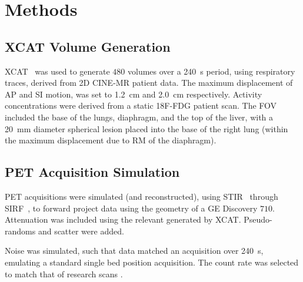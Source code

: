 \vspace{-0.4cm}

\section{Methods} \label{sec:methods}
    \subsection{\acrshort{XCAT} Volume Generation} \label{sec:xcat_volume_generation}
        \acrshort{XCAT}~\cite{Segars2010} was used to generate $480$ volumes over a \SI{240}{\second} period, using respiratory traces, derived from \acrshort{2D} CINE-\acrshort{MR} patient data. The maximum displacement of \gls{AP} and \gls{SI} motion, was set to \SI{1.2}{\centi\metre} and \SI{2.0}{\centi\metre} respectively. Activity concentrations were derived from a static \acrshort{18F-FDG} patient scan. The \acrlong{FOV} included the base of the lungs, diaphragm, and the top of the liver, with a \SI{20}{\milli\metre} diameter spherical lesion %
        placed into the base of the right lung (within the maximum displacement due to \acrlong{RM} of the diaphragm).
    
    \vspace{-0.5cm}
    
    \subsection{\acrshort{PET} Acquisition Simulation} \label{sec:pet_acquisition_simulation}
        \acrshort{PET} acquisitions were simulated (and reconstructed), using \acrshort{STIR}~\cite{Thielemans2012, Nikos2019} through \acrshort{SIRF}~\cite{Ovtchinnikov2017}, to forward project data using the geometry of a \acrshort{GE} Discovery $710$. Attenuation was included using the relevant  generated by \acrshort{XCAT}. Pseudo-randoms and scatter were added.%
        
        Noise was simulated, such that data matched an acquisition over \SI{240}{\second}, emulating a standard single bed position acquisition. The count rate was selected to match that of research scans%
        .
        
